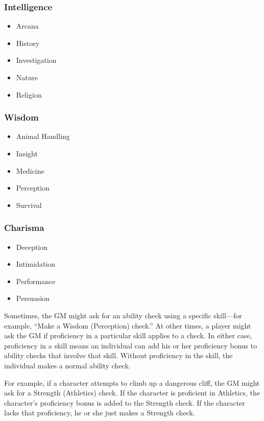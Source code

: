 \subsubsection{Intelligence}

\begin{itemize}
\item Arcana
\item History
\item Investigation
\item Nature
\item Religion
\end{itemize}

\subsubsection{Wisdom}

\begin{itemize}
\item Animal Handling
\item Insight
\item Medicine
\item Perception
\item Survival
\end{itemize}

\subsubsection{Charisma}

\begin{itemize}
\item Deception
\item Intimidation
\item Performance
\item Persuasion
\end{itemize}

Sometimes, the GM might ask for an ability check using a specific skill---for example, “Make a Wisdom (Perception) check.” At other times, a player might ask the GM if proficiency in a particular skill applies to a check. In either case, proficiency in a skill means an individual can add his or her proficiency bonus to ability checks that involve that skill. Without proficiency in the skill, the individual makes a normal ability check.

For example, if a character attempts to climb up a dangerous cliff, the GM might ask for a Strength (Athletics) check. If the character is proficient in Athletics, the character's proficiency bonus is added to the Strength check. If the character lacks that proficiency, he or she just makes a Strength check.

